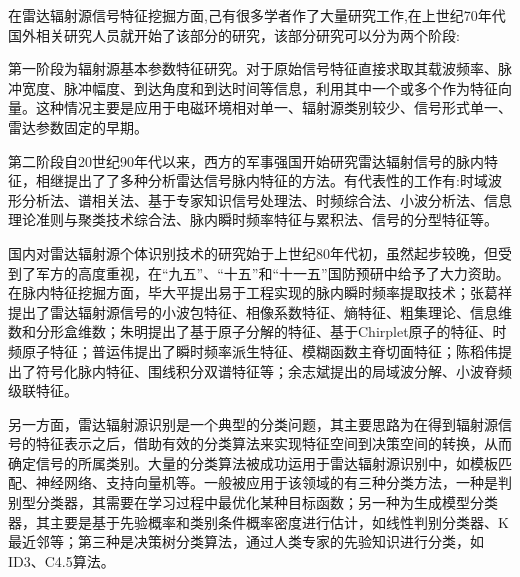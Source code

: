 在雷达辐射源信号特征挖掘方面,己有很多学者作了大量研究工作,在上世纪70年代国外相关研究人员就开始了该部分的研究\cite{therrien1974application}，该部分研究可以分为两个阶段:

第一阶段为辐射源基本参数特征研究。对于原始信号特征直接求取其载波频率、脉冲宽度、脉冲幅度、到达角度和到达时间等信息\cite{徐欣2001雷达截获系统实时信号分选处理技术研究}，利用其中一个或多个作为特征向量。这种情况主要是应用于电磁环境相对单一、辐射源类别较少、信号形式单一、雷达参数固定的早期。

第二阶段自20世纪90年代以来，西方的军事强国开始研究雷达辐射信号的脉内特征，相继提出了了多种分析雷达信号脉内特征的方法。有代表性的工作有:时域波形分析法\cite{roe1994real}、谱相关法\cite{jouny1995radar,zhang2001new}、基于专家知识信号处理法\cite{melvin2006knowledge,roe1990knowledge,capraro2006knowledge}、时频综合法\cite{rose1996emitter,chen1999joint,li2011quadratic,moraitakis2000feature}、小波分析法\cite{cohen2002importance}、信息理论准则与聚类技术综合法\cite{zhou1999combining}、脉内瞬时频率特征\cite{kawalec2004radar}与累积法\cite{aubry2011cumulants}、信号的分型特征等\cite{dudczyk2013identification,zhang2003fractal,dudczyk2013fractal}。

国内对雷达辐射源个体识别技术的研究始于上世纪80年代初，虽然起步较晚，但受到了军方的高度重视，在“九五”、“十五”和“十一五”国防预研中给予了大力资助。在脉内特征挖掘方面，毕大平提出易于工程实现的脉内瞬时频率提取技术\cite{毕大平2005基于瞬时频率的脉内调制识别技术}；张葛祥提出了雷达辐射源信号的小波包特征\cite{张葛祥2006基于小波包变换和特征选择的雷达辐射源信号识别}、相像系数特征\cite{张葛祥2005基于相像系数的雷达辐射源信号特征选择}、熵特征\cite{张葛祥2005基于熵特征的雷达辐射源信号识别}、粗集理论\cite{张葛祥2005基于粗集理论的雷达辐射源信号识别}、信息维数\cite{张葛祥2005雷达辐射源信号智能识别方法研究}和分形盒维数\cite{张葛祥2003雷达辐射源信号分形特征研究,张葛祥2004雷达辐射源信号脉内特征分析}；朱明提出了基于原子分解的特征\cite{朱明2007基于原子分解的辐射源信号二次特征提取}、基于Chirplet原子的特征、时频原子特征\cite{朱明2009一种基于}；普运伟提出了瞬时频率派生特征\cite{普运伟2009雷达辐射源信号瞬时频率派生特征分类方法}、模糊函数主脊切面特征\cite{普运伟2008雷达辐射源信号模糊函数主脊切面特征提取方法}；陈稻伟提出了符号化脉内特征\cite{陈韬伟2008雷达辐射源信号符号化脉内特征提取方法}、围线积分双谱特征\cite{陈韬伟2013基于围线积分双谱的雷达辐射源信号个体特征提取}等；余志斌提出的局域波分解\cite{余志斌2008基于局域波分解的雷达辐射源信号时频分析}、小波脊频级联特征\cite{余志斌2010一种新的,余志斌2010基于小波脊频级联特征的雷达辐射源信号识别}。

另一方面，雷达辐射源识别是一个典型的分类问题，其主要思路为在得到辐射源信号的特征表示之后，借助有效的分类算法来实现特征空间到决策空间的转换，从而确定信号的所属类别。大量的分类算法被成功运用于雷达辐射源识别中，如模板匹配\cite{dudczyk2015fast,dudczyk2004applying}、神经网络\cite{jouny1993classification,petrov2013identification,shieh2002vector,willson1990radar}、支持向量机\cite{ren2008radar}等。一般被应用于该领域的有三种分类方法，一种是判别型分类器，其需要在学习过程中最优化某种目标函数；另一种为生成模型分类器，其主要是基于先验概率和类别条件概率密度进行估计，如线性判别分类器\cite{mika1999fisher}、K最近邻\cite{cover1967nearest}等；第三种是决策树分类算法，通过人类专家的先验知识进行分类，如ID3、C4.5算法\cite{quinlan1996bagging,lyden1999id1}。

